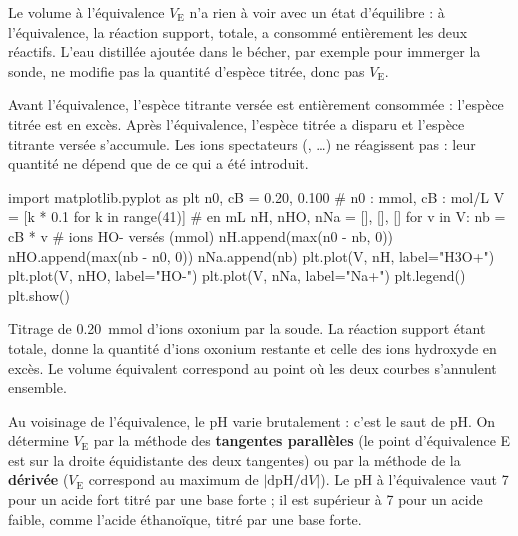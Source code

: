 \begin{attention}
Le volume à l'équivalence $V_\mathrm{E}$ n'a rien à voir avec un état d'équilibre : à l'équivalence, la réaction
support, totale, a consommé entièrement les deux réactifs. L'eau distillée ajoutée dans le bécher, par exemple
pour immerger la sonde, ne modifie pas la quantité d'espèce titrée, donc pas $V_\mathrm{E}$.
\end{attention}
\begin{propriete}
Avant l'équivalence, l'espèce titrante versée est entièrement consommée : l'espèce titrée est en excès.
Après l'équivalence, l'espèce titrée a disparu et l'espèce titrante versée s'accumule. Les ions spectateurs
(, …) ne réagissent pas : leur quantité ne dépend que de ce qui a été introduit.
\end{propriete}
\begin{codecote}[0.58]
\begin{pythoncol}
import matplotlib.pyplot as plt
n0, cB = 0.20, 0.100  # n0 : mmol, cB : mol/L
V = [k * 0.1 for k in range(41)]   # en mL
nH, nHO, nNa = [], [], []
for v in V:
    nb = cB * v       # ions HO- versés (mmol)
    nH.append(max(n0 - nb, 0))
    nHO.append(max(nb - n0, 0))
    nNa.append(nb)
plt.plot(V, nH, label="H3O+")
plt.plot(V, nHO, label="HO-")
plt.plot(V, nNa, label="Na+")
plt.legend()
plt.show()
\end{pythoncol}
\cote
\fontsize{9.5}{12.5}\selectfont
{}\par\smallskip
Titrage de \qty{0,20}{mmol} d'ions oxonium par la soude. La réaction support  étant
totale,  donne la quantité d'ions oxonium restante et  celle
des ions hydroxyde en excès. Le volume équivalent correspond au point où les deux courbes s'annulent ensemble.
\end{codecote}
\begin{propriete}
Au voisinage de l'équivalence, le pH varie brutalement : c'est le saut de pH. On détermine $V_\mathrm{E}$ par la
méthode des \textbf{tangentes parallèles} (le point d'équivalence E est sur la droite équidistante des deux
tangentes) ou par la méthode de la \textbf{dérivée} ($V_\mathrm{E}$ correspond au maximum de
$\left|\mathrm{dpH}/\mathrm{d}V\right|$). Le pH à l'équivalence vaut 7 pour un acide fort titré par une base forte ;
il est supérieur à 7 pour un acide faible, comme l'acide éthanoïque, titré par une base forte.
\end{propriete}
